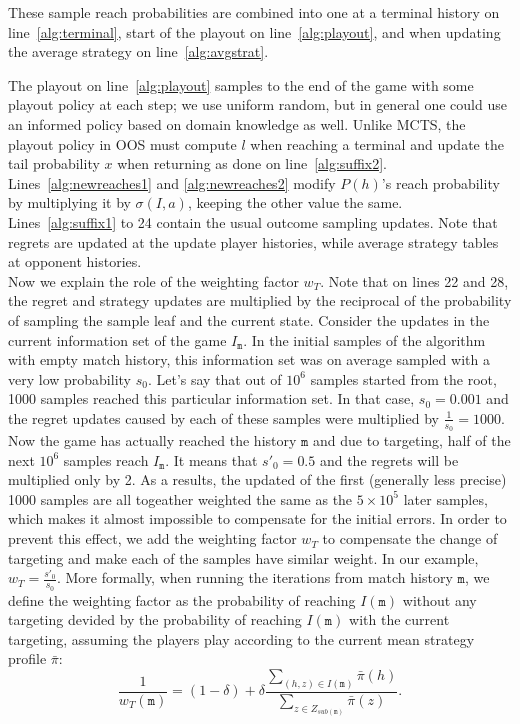 \documentclass{aamas2015}
\newcommand{\ttm}{\mathtt{m}}
\begin{document}
These sample reach probabilities are combined into one at a terminal history on line~\ref{alg:terminal}, 
start of the playout on line~\ref{alg:playout}, and when updating the average 
strategy on line~\ref{alg:avgstrat}. 

The playout on line~\ref{alg:playout} samples to the end of the game with some playout policy at each step; we use uniform random, 
but in general one could use an informed policy based on domain knowledge as well. 
Unlike MCTS, the playout policy in OOS must compute $l$ when reaching a terminal and update the tail probability $x$ when returning
as done on line~\ref{alg:suffix2}. Lines~\ref{alg:newreaches1} and \ref{alg:newreaches2} modify $P(h)$'s reach probability 
by multiplying it by $\sigma(I,a)$, keeping the other value the same.
Lines~\ref{alg:suffix1} to 24
contain the usual outcome sampling updates. Note that regrets are updated at the 
update player histories, while average strategy tables at opponent histories. \\


Now we explain the role of the weighting factor $w_T$. Note that on lines 22 and 28, the regret and strategy updates are multiplied by the reciprocal of the probability of sampling the sample leaf and the current state. 
Consider the updates in the current information set of the game $I_\ttm$. In the initial samples of the algorithm with empty match history, this information set was on average sampled with a very low probability $s_0$. Let's say that out of $10^6$ samples started from the root, 1000 samples reached this particular information set. In that case, $s_0=0.001$ and the regret updates caused by each of these samples were multiplied by $\frac{1}{s_0}=1000$.
Now the game has actually reached the history $\ttm$ and due to targeting, half of the next $10^6$ samples reach $I_\ttm$. It means that  $s'_0=0.5$ and the regrets will be multiplied only by 2.
As a results, the updated of the first (generally less precise) 1000 samples are all togeather weighted the same as the $5\times 10^5$ later samples, which makes it almost impossible to compensate for the initial errors.
In order to prevent this effect, we add the weighting factor $w_T$ to compensate the change of targeting and make each of the samples have similar weight. 
In our example, $w_T=\frac{s'_0}{s_0}$. More formally, when running the iterations from match history $\ttm$, we define the weighting factor as the probability of reaching $I(\ttm)$ without any targeting devided by the probability of reaching $I(\ttm)$ with the current targeting, assuming the players play according to the current mean strategy profile $\bar{\pi}$:
\[\frac{1}{w_T(\ttm)} =  (1-\delta) + \delta\frac{\sum_{(h,z)\in I(\ttm)} \bar{\pi}(h)}{\sum_{z\in Z_{sub(\ttm)}} \bar{\pi}(z)}.\]
\end{document}
